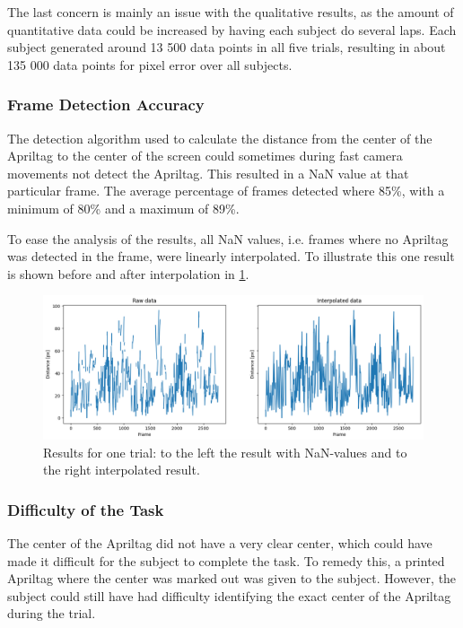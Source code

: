 \documentclass[nofilelist]{cslthse-msc}
\begin{document}
The last concern is mainly an issue with the qualitative results, as the amount of quantitative data could be increased by having each subject do several laps. Each subject generated around 13 500 data points in all five trials, resulting in about 135 000 data points for pixel error over all subjects.

\subsubsection{Frame Detection Accuracy}
The detection algorithm used to calculate the distance from the center of the Apriltag to the center of the screen could sometimes during fast camera movements not detect the Apriltag. This resulted in a NaN value at that particular frame. The average percentage of frames detected where 85\%, with a minimum of 80\% and a maximum of 89\%.

To ease the analysis of the results, all NaN values, i.e. frames where no Apriltag was detected in the frame, were linearly interpolated. To illustrate this one result is shown before and after interpolation in \ref{fig:raw-vs-interpolated}. 

\begin{figure}[!hbt]
   \centering
   \includegraphics[scale=0.5]{images/raw-vs-interpolated.png} 
   \caption{Results for one trial: to the left the result with NaN-values and to the right interpolated result.}
   \label{fig:raw-vs-interpolated}
\end{figure}

\subsubsection{Difficulty of the Task}
The center of the Apriltag did not have a very clear center, which could have made it difficult for the subject to complete the task. To remedy this, a printed Apriltag where the center was marked out was given to the subject. However, the subject could still have had difficulty identifying the exact center of the Apriltag during the trial.
\end{document}
